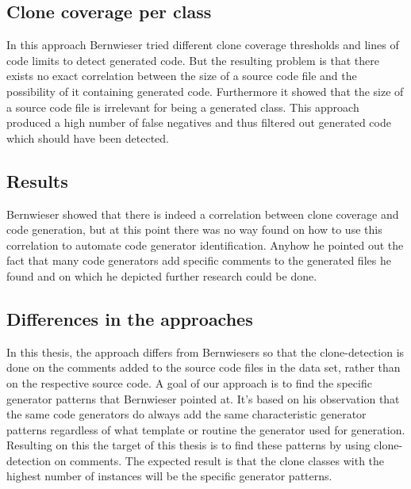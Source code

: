 \subsection{Clone coverage per class}
In this approach Bernwieser tried different clone coverage thresholds and lines of code limits to detect generated code. But the resulting problem is that there exists no exact correlation between the size of a source code file and the possibility of it containing generated code. Furthermore it showed that the size of a source code file is irrelevant for being a generated class. This approach produced a high number of false negatives and thus filtered out generated code which should have been detected.

\subsection{Results}
Bernwieser showed that there is indeed a correlation between clone coverage and code generation, but at this point there was no way found on how to use this correlation to automate code generator identification. Anyhow he pointed out the fact that many code generators add specific comments to the generated files he found and on which he depicted further research could be done.

\subsection{Differences in the approaches}
In this thesis, the approach differs from Bernwiesers so that the clone-detection is done on the comments added to the source code files in the data set, rather than on the respective source code. A goal of our approach is to find the specific generator patterns that Bernwieser pointed at. It's based on his observation that the same code generators do always add the same characteristic generator patterns regardless of what template or routine the generator used for generation. Resulting on this the target of this thesis is to find these patterns by using clone-detection on comments. The expected result is that the clone classes with the highest number of instances will be the specific generator patterns.


